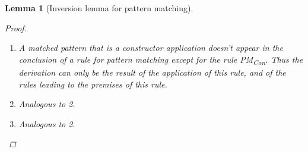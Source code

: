 \documentclass[11pt]{article} %
\newtheorem{lemma}{Lemma}
\begin{document}
\begin{lemma}[Inversion lemma for pattern matching]
\begin{proof}
\begin{enumerate}
\item A matched pattern that is a constructor application doesn't appear in the conclusion of a rule for pattern matching except for the rule PM\textsubscript{Con}. Thus the derivation can only be the result of the application of this rule, and of the rules leading to the premises of this rule.

\item Analogous to 2.

\item Analogous to 2.

\end{enumerate}

\end{proof}

\end{lemma}

%
%
%
%
%
%
%
%
%
%
%
\end{document}

